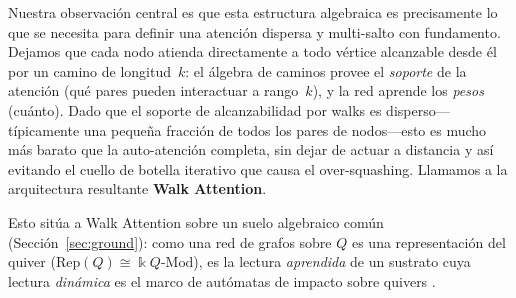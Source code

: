 \documentclass[runningheads]{llncs}
\newcommand{\kk}{\Bbbk}                 %
\newcommand{\kQ}{\kk Q}                 %
\begin{document}
Nuestra observaci\'on central es que esta estructura algebraica es precisamente lo
que se necesita para definir una atenci\'on dispersa y multi-salto con fundamento.
Dejamos que cada nodo atienda directamente a todo v\'ertice alcanzable desde \'el
por un camino de longitud~$k$: el \'algebra de caminos provee el \emph{soporte} de
la atenci\'on (qu\'e pares pueden interactuar a rango~$k$), y la red aprende los
\emph{pesos} (cu\'anto). Dado que el soporte de alcanzabilidad por walks es
disperso---t\'ipicamente una peque\~na fracci\'on de todos los pares de nodos---esto
es mucho m\'as barato que la auto-atenci\'on completa, sin dejar de actuar a
distancia y as\'i evitando el cuello de botella iterativo que causa el
over-squashing. Llamamos a la arquitectura resultante \textbf{Walk Attention}.

Esto sit\'ua a Walk Attention sobre un suelo algebraico com\'un
(Secci\'on~\ref{sec:ground}): como una red de grafos sobre $Q$ es una
representaci\'on del quiver ($\mathrm{Rep}(Q)\cong\kQ\text{-}\mathrm{Mod}$), es la
lectura \emph{aprendida} de un sustrato cuya lectura \emph{din\'amica} es el marco
de aut\'omatas de impacto sobre quivers \cite{zainea2026aiq}.
\end{document}
